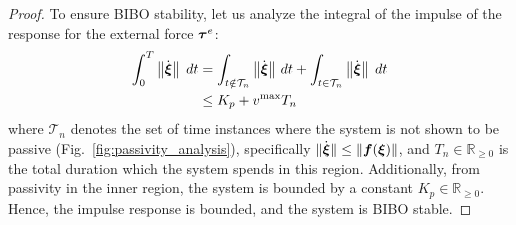 \begin{proof}

To ensure BIBO stability, let us analyze the integral of the impulse of the response for the external force $\boldsymbol{\tau}^e$: 
\begin{equation}
	\begin{split}
	  \int_{0}^{T} \left\| \dot{\vecs \xi} \right\| \; dt 
	  & = \int_{t \notin \mathcal{T}_n} \left\| \dot {\vecs \xi} \right\|  \, dt + \int_{t \in  \mathcal{T}_n} \left\| \dot {\vecs \xi} \right\| \;  dt \\ 
	  & \leq K_p + v^{\mathrm{max}} T_n
\end{split}
\label{eq:bibo_velocity}
\end{equation}
where $\mathcal{T}_n$ denotes the set of time instances where the system is not shown to be passive (Fig.~\ref{fig:passivity_analysis}), specifically $\| \dot{\boldsymbol{\xi}} \| \leq \| \boldsymbol{f} (\boldsymbol{\xi}) \|$, and $T_n \in \mathbb{R}_{\geq 0}$ is the total duration which the system spends in this region. Additionally, from passivity in the inner region, the system is bounded by a constant $K_p \in \mathbb{R}_{\geq 0}$.
Hence, the impulse response is bounded, and the system is BIBO stable.


\end{proof}
